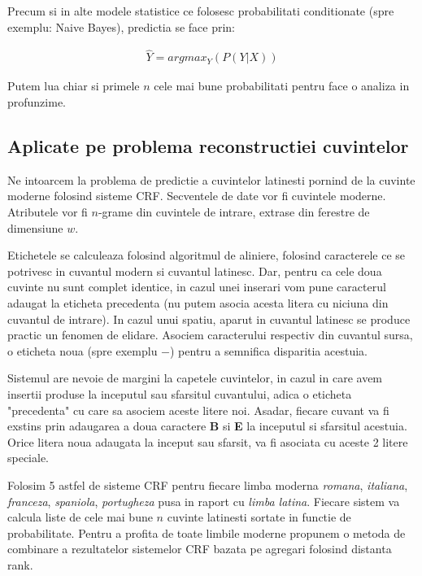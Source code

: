 Precum si in alte modele statistice ce folosesc probabilitati conditionate (spre exemplu: Naive Bayes),
predictia se face prin:

\begin{gather*}
  \hat{Y} = argmax_Y(P(Y|X))
\end{gather*}

Putem lua chiar si primele $n$ cele mai bune probabilitati pentru face o analiza in profunzime.

\subsection{Aplicate pe problema reconstructiei cuvintelor}
\label{subs:one}
Ne intoarcem la problema de predictie a cuvintelor latinesti pornind de la cuvinte moderne folosind 
sisteme CRF. Secventele de date vor fi cuvintele moderne. Atributele vor fi $n$-grame din cuvintele
de intrare, extrase din ferestre de dimensiune $w$. 

Etichetele se calculeaza folosind algoritmul de aliniere, folosind caracterele ce se potrivesc in 
cuvantul modern si cuvantul latinesc. Dar, pentru ca cele doua cuvinte nu sunt complet identice,
in cazul unei inserari vom pune caracterul adaugat la eticheta precedenta (nu putem asocia acesta
litera cu niciuna din cuvantul de intrare). In cazul unui spatiu, aparut in cuvantul latinesc se 
produce practic un fenomen de elidare. Asociem caracterului respectiv din cuvantul sursa, o eticheta
noua (spre exemplu $-$) pentru a semnifica disparitia acestuia.

Sistemul are nevoie de margini la capetele cuvintelor, in cazul in care avem insertii produse la 
inceputul sau sfarsitul cuvantului, adica o eticheta "precedenta" cu care sa asociem aceste litere noi.
Asadar, fiecare cuvant va fi exstins prin adaugarea a doua caractere \textbf{B} si \textbf{E} la 
inceputul si sfarsitul acestuia.\cite{theone} Orice litera noua adaugata la inceput sau sfarsit, va
fi asociata cu aceste 2 litere speciale.


Folosim 5 astfel de sisteme CRF pentru fiecare limba moderna \textit{romana}, \textit{italiana}, 
\textit{franceza}, \textit{spaniola}, \textit{portugheza} pusa in raport cu \textit{limba latina}.
Fiecare sistem va calcula liste de cele mai bune $n$ cuvinte latinesti sortate in functie de 
probabilitate. Pentru a profita de toate limbile moderne propunem o metoda de combinare a rezultatelor
sistemelor CRF bazata pe agregari folosind distanta rank.
